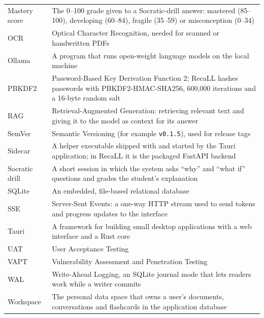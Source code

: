 \begin{small}
\begin{longtable}{@{}>{\raggedright\arraybackslash}p{3.0cm} >{\raggedright\arraybackslash}p{}@{}}
Mastery score & The 0--100 grade given to a Socratic-drill answer: mastered (85--100),
developing (60--84), fragile (35--59) or misconception (0--34)\\
OCR & Optical Character Recognition, needed for scanned or handwritten PDFs\\
Ollama & A program that runs open-weight language models on the local machine\\
PBKDF2 & Password-Based Key Derivation Function 2; RecaLL hashes passwords with
PBKDF2-HMAC-SHA256, 600{,}000 iterations and a 16-byte random salt \cite{owaspPassword}\\
RAG & Retrieval-Augmented Generation: retrieving relevant text and giving it to the model
as context for its answer \cite{lewis2020rag}\\
SemVer & Semantic Versioning (for example \texttt{v0.1.5}), used for release tags\\
Sidecar & A helper executable shipped with and started by the Tauri application; in RecaLL
it is the packaged FastAPI backend\\
Socratic drill & A short session in which the system asks ``why'' and ``what if'' questions
and grades the student's explanation\\
SQLite & An embedded, file-based relational database\\
SSE & Server-Sent Events: a one-way HTTP stream used to send tokens and progress updates
to the interface\\
Tauri & A framework for building small desktop applications with a web interface and a
Rust core\\
UAT & User Acceptance Testing\\
VAPT & Vulnerability Assessment and Penetration Testing\\
WAL & Write-Ahead Logging, an SQLite journal mode that lets readers work while a writer
commits\\
Workspace & The personal data space that owns a user's documents, conversations and
flashcards in the application database\\
\end{longtable}
\end{small}
